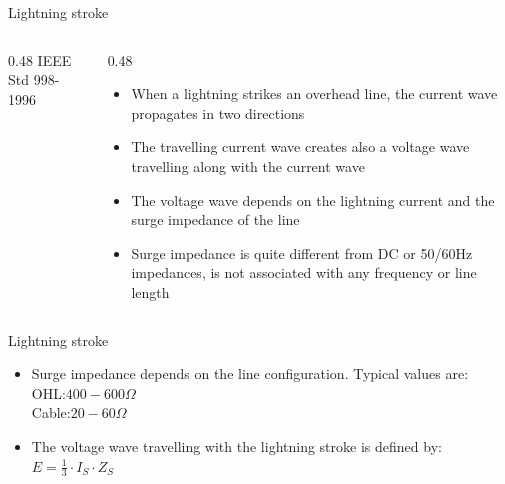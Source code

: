 
\begin{frame}{Lightning stroke}
  \begin{columns}[c,onlytextwidth]
    \begin{column}{0.48\textwidth}
      \centering
      {\color{atGray}\footnotesize IEEE Std 998-1996}
    \end{column}

    \begin{column}{0.48\textwidth}
      \begin{itemize}
        \setlength{\itemsep}{0.35em}
        \item When a lightning strikes an overhead line, the current wave propagates in two directions
        \item The travelling current wave creates also a voltage wave travelling along with the current wave
        \item The voltage wave depends on the lightning current and the surge impedance of the line
        \item Surge impedance is quite different from DC or 50/60Hz impedances, is not associated with any frequency or line length
      \end{itemize}

    \end{column}
  \end{columns}
  \vspace{0.3em}
\end{frame}

\begin{frame}{Lightning stroke}
  \begin{itemize}
    \item Surge impedance depends on the line configuration. Typical values are:\\
    \quad OHL:\quad$400 - 600  \Omega$ \\
    \quad Cable:\quad$20 - 60  \Omega$
    \item The voltage wave travelling with the lightning stroke is defined by: \\
    \quad $E=\frac{1}{3} \cdot I_S \cdot Z_S$
    \quad

  \end{itemize}
\end{frame}

